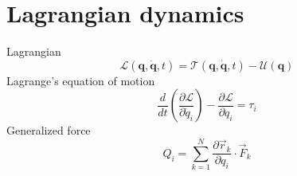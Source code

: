 \section{Lagrangian dynamics}
Lagrangian
\begin{equation}
    \mathcal{L}(\mathbf{q, \dot{q}}, t) = \mathcal{T}(\mathbf{q, \dot{q}}, t) - \mathcal{U}(\mathbf{q})
\end{equation}
Lagrange's equation of motion
\begin{equation}
    \frac{d}{dt} \left( \frac{\partial \mathcal{L}}{\partial \dot{q}_i} \right) - \frac{\partial \mathcal{L}}{\partial q_i} = \tau_i
\end{equation}
Generalized force
\begin{equation}
    Q_i = \sum_{k=1}^N \frac{\partial \vec{r}_k}{\partial q_i} \cdot \vec{F}_k
\end{equation}
